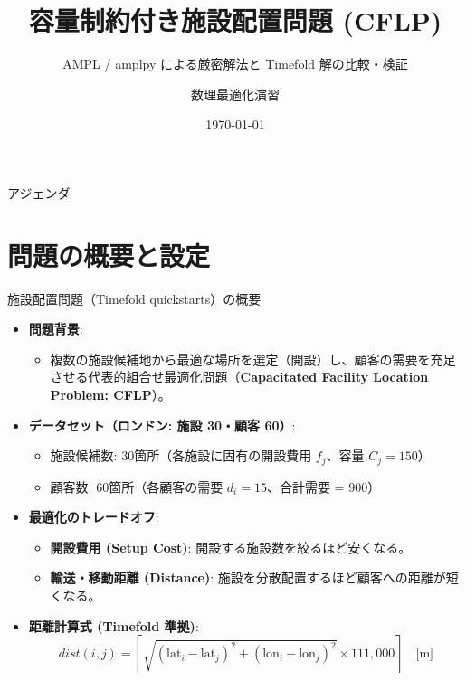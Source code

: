 \documentclass[aspectratio=169,11pt]{beamer}
\title{\textbf{容量制約付き施設配置問題 (CFLP)}}
\subtitle{AMPL / amplpy による厳密解法と Timefold 解の比較・検証}
\author{数理最適化演習}
\date{\today}
\institute{lecture2026}
\begin{document}
\maketitle

\begin{frame}{アジェンダ}
  \tableofcontents[hideallsubsections]
\end{frame}

\section{問題の概要と設定}

\begin{frame}{施設配置問題（Timefold quickstarts）の概要}
  \begin{itemize}\small
    \item \textbf{問題背景}:
      \begin{itemize}\footnotesize
        \item 複数の施設候補地から最適な場所を選定（開設）し、顧客の需要を充足させる代表的組合せ最適化問題（\alert{\textbf{Capacitated Facility Location Problem: CFLP}}）。
      \end{itemize}
    \item \textbf{データセット（ロンドン: 施設 30・顧客 60）}:
      \begin{itemize}\footnotesize
        \item 施設候補数: 30箇所（各施設に固有の開設費用 $f_j$、容量 $C_j = 150$）
        \item 顧客数: 60箇所（各顧客の需要 $d_i = 15$、合計需要 = 900）
      \end{itemize}
    \item \textbf{最適化のトレードオフ}:
      \begin{itemize}\footnotesize
        \item \textbf{開設費用 (Setup Cost)}: 開設する施設数を絞るほど安くなる。
        \item \textbf{輸送・移動距離 (Distance)}: 施設を分散配置するほど顧客への距離が短くなる。
      \end{itemize}
    \item \textbf{距離計算式 (Timefold 準拠)}:
      \begin{equation*}
        dist(i, j) = \left\lceil \sqrt{(\text{lat}_i - \text{lat}_j)^2 + (\text{lon}_i - \text{lon}_j)^2} \times 111{,}000 \right\rceil \quad \text{[m]}
      \end{equation*}
  \end{itemize}
\end{frame}
\end{document}
